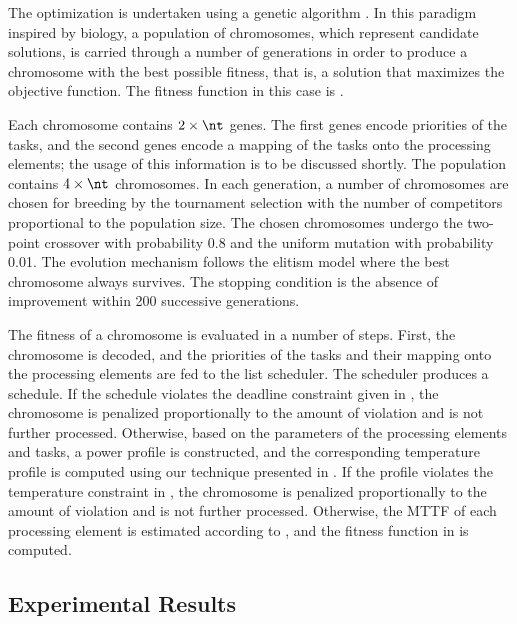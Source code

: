 The optimization is undertaken using a genetic algorithm \cite{schmitz2004}. In
this paradigm inspired by biology, a population of chromosomes, which represent
candidate solutions, is carried through a number of generations in order to
produce a chromosome with the best possible fitness, that is, a solution that
maximizes the objective function. The fitness function in this case is
.

Each chromosome contains $2 \times \nt$ genes. The first \nt genes encode
priorities of the tasks, and the second \nt genes encode a mapping of the tasks
onto the processing elements; the usage of this information is to be discussed
shortly. The population contains $4 \times \nt$ chromosomes. In each generation,
a number of chromosomes are chosen for breeding by the tournament selection with
the number of competitors proportional to the population size. The chosen
chromosomes undergo the two-point crossover with probability 0.8 and the uniform
mutation with probability 0.01. The evolution mechanism follows the elitism
model where the best chromosome always survives. The stopping condition is the
absence of improvement within 200 successive generations.

The fitness of a chromosome is evaluated in a number of steps. First, the
chromosome is decoded, and the priorities of the tasks and their mapping onto
the processing elements are fed to the list scheduler. The scheduler produces a
schedule. If the schedule violates the deadline constraint given in
, the chromosome is penalized proportionally
to the amount of violation and is not further processed. Otherwise, based on the
parameters of the processing elements and tasks, a power profile \mp is
constructed, and the corresponding temperature profile \mq is computed using our
technique presented in . If the profile
violates the temperature constraint in , the
chromosome is penalized proportionally to the amount of violation and is not
further processed. Otherwise, the \ac{MTTF} of each processing element is
estimated according to , and the fitness function in
 is computed.

\subsection{Experimental Results}

